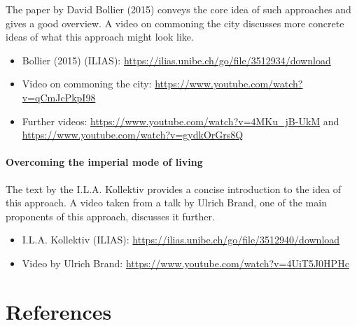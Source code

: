 \documentclass[
  british,
  a4paper,
  DIV=11,
  numbers=noendperiod,
  oneside,
  openany]{scrreprt}
\providecommand{\tightlist}{%
  \setlength{\itemsep}{0pt}\setlength{\parskip}{0pt}}
\begin{document}
The paper by David Bollier (2015) conveys the core idea of such
approaches and gives a good overview. A video on commoning the city
discusses more concrete ideas of what this approach might look like.

\begin{itemize}
\tightlist
\item
  Bollier (2015) (ILIAS):
  \url{https://ilias.unibe.ch/go/file/3512934/download}
\item
  Video on commoning the city:
  \url{https://www.youtube.com/watch?v=qCmJcPkpI98}
\item
  Further videos: \url{https://www.youtube.com/watch?v=4MKu_jB-UkM} and
  \url{https://www.youtube.com/watch?v=gydkOrGrs8Q}
\end{itemize}

\subsubsection{Overcoming the imperial mode of
living}\label{overcoming-the-imperial-mode-of-living-1}

The text by the I.L.A. Kollektiv provides a concise introduction to the
idea of this approach. A video taken from a talk by Ulrich Brand, one of
the main proponents of this approach, discusses it further.

\begin{itemize}
\tightlist
\item
  I.L.A. Kollektiv (ILIAS):
  \url{https://ilias.unibe.ch/go/file/3512940/download}
\item
  Video by Ulrich Brand:
  \url{https://www.youtube.com/watch?v=4UiT5J0HPHc}
\end{itemize}


\chapter*{References}\label{references}

\end{document}
